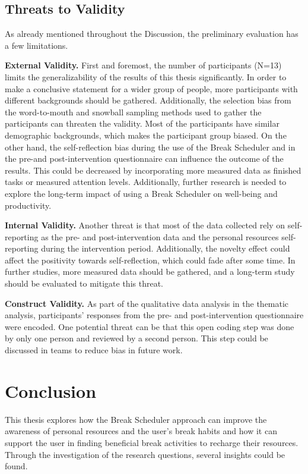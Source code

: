 \documentclass{hasel_thesis}
\begin{document}
\section{Threats to Validity} \label{threats}

As already mentioned throughout the Discussion, the preliminary evaluation has a few limitations. 

\textbf{External Validity.} First and foremost, the number of participants (N=13) limits the generalizability of the results of this thesis significantly. In order to make a conclusive statement for a wider group of people, more participants with different backgrounds should be gathered. Additionally, the selection bias from the word-to-mouth and snowball sampling methods used to gather the participants can threaten the validity. Most of the participants have similar demographic backgrounds, which makes the participant group biased. On the other hand, the self-reflection bias during the use of the Break Scheduler and in the pre-and post-intervention questionnaire can influence the outcome of the results. This could be decreased by incorporating more measured data as finished tasks or measured attention levels. Additionally, further research is needed to explore the long-term impact of using a Break Scheduler on well-being and productivity.

\textbf{Internal Validity.} Another threat is that most of the data collected rely on self-reporting as the pre- and post-intervention data and the personal resources self-reporting during the intervention period. Additionally, the novelty effect could affect the positivity towards self-reflection, which could fade after some time. In further studies, more measured data should be gathered, and a long-term study should be evaluated to mitigate this threat.

\textbf{Construct Validity.} As part of the qualitative data analysis in the thematic analysis, participants' responses from the pre- and post-intervention questionnaire were encoded. One potential threat can be that this open coding step was done by only one person and reviewed by a second person. This step could be discussed in teams to reduce bias in future work.



\chapter{Conclusion} \label{conclusion}

%
This thesis explores how the Break Scheduler approach  can improve the awareness of personal resources and the user's break habits and how it can support the user in finding beneficial break activities to recharge their resources. Through the investigation of the research questions, several insights could be found.
\end{document}

